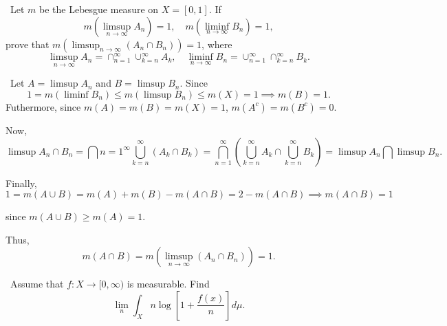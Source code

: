 \documentclass[12pt]{Qual}
\begin{document}
\begin{problem} $\,$
Let $m$ be the Lebesgue measure on $X=[0,1].$ If $$m(\limsup_{n\to\infty} A_n)=1,\quad m(\liminf_{n\to\infty} B_n)=1,$$ prove that $\displaystyle m\left(\limsup_{n\to\infty}(A_n\cap B_n)\right)=1$, where $$\limsup_{n\to\infty} A_n=\cap_{n=1}^\infty\cup_{k=n}^\infty A_k,\quad \liminf_{n\to\infty} B_n=\cup_{n=1}^\infty\cap_{k=n}^\infty B_k.$$
\end{problem}


\begin{solution}$\,$
Let $A=\limsup A_n$ and $B=\limsup B_n$. Since $$1=m(\liminf B_n)\le m(\limsup B_n)\le m(X)=1\implies m(B)=1.$$ Futhermore, since $m(A)=m(B)=m(X)=1$, $m(A^c)=m(B^c)=0$.

Now, $$\limsup A_n\cap B_n=\bigcap{n=1}^\infty\bigcup_{k=n}^\infty(A_k\cap B_k)=\bigcap_{n=1}^\infty\left(\bigcup_{k=n}^\infty A_k\cap\bigcup_{k=n}^\infty B_k\right)=\limsup A_n\bigcap \limsup B_n.$$

Finally, $$1=m(A\cup B)=m(A)+m(B)-m(A\cap B)=2-m(A\cap B)\implies m(A\cap B)=1$$

since $m(A\cup B)\ge m(A)=1.$

Thus, $$m(A\cap B)=m\left(\limsup_{n\to\infty}(A_n\cap B_n)\right)=1.$$
\end{solution}
\newpage

\begin{problem} $\,$
Assume that $f:X\to[0,\infty)$ is measurable. Find $$\lim_n\int_X n\log\left[1+\frac{f(x)}{n}\right]d\mu.$$
\end{problem}
\end{document}
